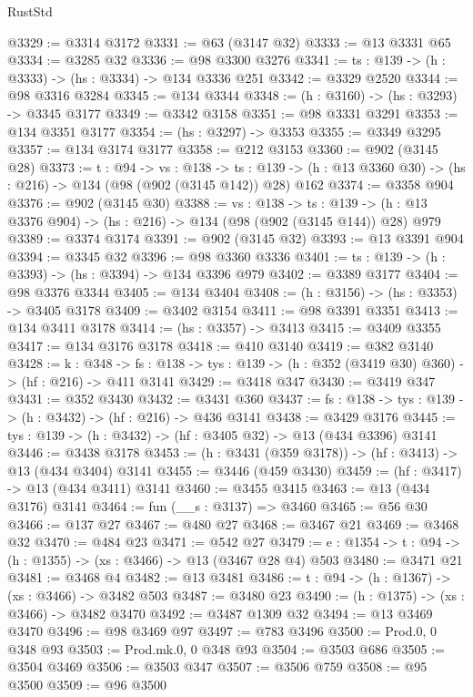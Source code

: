 \begin{lexlean}{RustStd}
\begin{coremodule}
{\begin{coremodule}
{{{{{{{{{@3329 := @3314 @3172
@3331 := @63 (@3147 @32)
@3333 := @13 @3331 @65
@3334 := @3285 @32
@3336 := @98 @3300 @3276
@3341 := {ts : @139} -> (h : @3333) -> (hs : @3334) -> @134 @3336 @251
@3342 := @3329 @2520
@3344 := @98 @3316 @3284
@3345 := @134 @3344
@3348 := (h : @3160) -> (hs : @3293) -> @3345 @3177
@3349 := @3342 @3158
@3351 := @98 @3331 @3291
@3353 := @134 @3351 @3177
@3354 := (hs : @3297) -> @3353
@3355 := @3349 @3295
@3357 := @134 @3174 @3177
@3358 := @212 @3153
@3360 := @902 (@3145 @28)
@3373 := {t : @94} ->
  {vs : @138} ->
  {ts : @139} -> (h : @13 @3360 @30) -> (hs : @216) -> @134 (@98 (@902 (@3145 @142)) @28) @162
@3374 := @3358 @904
@3376 := @902 (@3145 @30)
@3388 := {vs : @138} ->
  {ts : @139} -> (h : @13 @3376 @904) -> (hs : @216) -> @134 (@98 (@902 (@3145 @144)) @28) @979
@3389 := @3374 @3174
@3391 := @902 (@3145 @32)
@3393 := @13 @3391 @904
@3394 := @3345 @32
@3396 := @98 @3360 @3336
@3401 := {ts : @139} -> (h : @3393) -> (hs : @3394) -> @134 @3396 @979
@3402 := @3389 @3177
@3404 := @98 @3376 @3344
@3405 := @134 @3404
@3408 := (h : @3156) -> (hs : @3353) -> @3405 @3178
@3409 := @3402 @3154
@3411 := @98 @3391 @3351
@3413 := @134 @3411 @3178
@3414 := (hs : @3357) -> @3413
@3415 := @3409 @3355
@3417 := @134 @3176 @3178
@3418 := @410 @3140
@3419 := @382 @3140
@3428 := {k : @348} ->
  {fs : @138} -> {tys : @139} -> (h : @352 (@3419 @30) @360) -> (hf : @216) -> @411 @3141
@3429 := @3418 @347
@3430 := @3419 @347
@3431 := @352 @3430
@3432 := @3431 @360
@3437 := {fs : @138} -> {tys : @139} -> (h : @3432) -> (hf : @216) -> @436 @3141
@3438 := @3429 @3176
@3445 := {tys : @139} -> (h : @3432) -> (hf : @3405 @32) -> @13 (@434 @3396) @3141
@3446 := @3438 @3178
@3453 := (h : @3431 (@359 @3178)) -> (hf : @3413) -> @13 (@434 @3404) @3141
@3455 := @3446 (@459 @3430)
@3459 := (hf : @3417) -> @13 (@434 @3411) @3141
@3460 := @3455 @3415
@3463 := @13 (@434 @3176) @3141
@3464 := fun (__s : @3137) => @3460
@3465 := @56 @30
@3466 := @137 @27
@3467 := @480 @27
@3468 := @3467 @21
@3469 := @3468 @32
@3470 := @484 @23
@3471 := @542 @27
@3479 := {e : @1354} -> {t : @94} -> (h : @1355) -> (xs : @3466) -> @13 (@3467 @28 @4) @503
@3480 := @3471 @21
@3481 := @3468 @4
@3482 := @13 @3481
@3486 := {t : @94} -> (h : @1367) -> (xs : @3466) -> @3482 @503
@3487 := @3480 @23
@3490 := (h : @1375) -> (xs : @3466) -> @3482 @3470
@3492 := @3487 @1309 @32
@3494 := @13 @3469 @3470
@3496 := @98 @3469 @97
@3497 := @783 @3496
@3500 := Prod.{0, 0} @348 @93
@3503 := Prod.mk.{0, 0} @348 @93
@3504 := @3503 @686
@3505 := @3504 @3469
@3506 := @3503 @347
@3507 := @3506 @759
@3508 := @95 @3500
@3509 := @96 @3500
}}}}}}}}}
\end{coremodule}}
\end{coremodule}
\end{lexlean}

